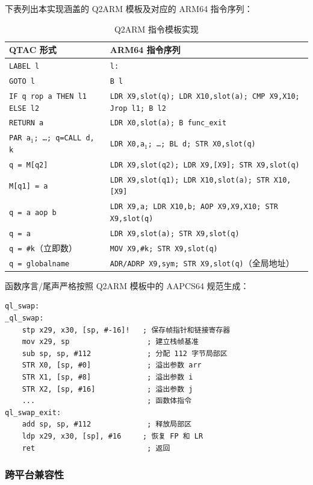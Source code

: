 \documentclass[12pt,a4paper]{ctexart}
\begin{document}
下表列出本实现涵盖的 Q2ARM 模板及对应的 ARM64 指令序列：

\begin{table}[H]
\centering
\caption{Q2ARM 指令模板实现}
\label{tab:q2arm}
\begin{tabular}{ll}
\toprule
QTAC 形式 & ARM64 指令序列 \\
\midrule
\texttt{LABEL l} & \texttt{l:} \\
\texttt{GOTO l}  & \texttt{B l} \\
\texttt{IF q rop a THEN l1 ELSE l2} & \texttt{LDR X9,slot(q); LDR X10,slot(a); CMP X9,X10; Jrop l1; B l2} \\
\texttt{RETURN a} & \texttt{LDR X0,slot(a); B func\_exit} \\
\texttt{PAR a$_1$; \ldots; q=CALL d, k} & \texttt{LDR X0,a$_1$; \ldots; BL d; STR X0,slot(q)} \\
\texttt{q = M[q2]} & \texttt{LDR X9,slot(q2); LDR X9,[X9]; STR X9,slot(q)} \\
\texttt{M[q1] = a} & \texttt{LDR X9,slot(q1); LDR X10,slot(a); STR X10,[X9]} \\
\texttt{q = a aop b} & \texttt{LDR X9,a; LDR X10,b; AOP X9,X9,X10; STR X9,slot(q)} \\
\texttt{q = a} & \texttt{LDR X9,slot(a); STR X9,slot(q)} \\
\texttt{q = \#k}（立即数） & \texttt{MOV X9,\#k; STR X9,slot(q)} \\
\texttt{q = globalname} & \texttt{ADR/ADRP X9,sym; STR X9,slot(q)}（全局地址） \\
\bottomrule
\end{tabular}
\end{table}

函数序言/尾声严格按照 Q2ARM 模板中的 AAPCS64 规范生成：

\begin{lstlisting}[language=ARM, caption={函数序言与尾声（以 swap 为例，Linux 目标）}]
ql_swap:
_ql_swap:
    stp x29, x30, [sp, #-16]!   ; 保存帧指针和链接寄存器
    mov x29, sp                  ; 建立栈帧基准
    sub sp, sp, #112             ; 分配 112 字节局部区
    STR X0, [sp, #0]             ; 溢出参数 arr
    STR X1, [sp, #8]             ; 溢出参数 i
    STR X2, [sp, #16]            ; 溢出参数 j
    ...                          ; 函数体指令
ql_swap_exit:
    add sp, sp, #112             ; 释放局部区
    ldp x29, x30, [sp], #16     ; 恢复 FP 和 LR
    ret                          ; 返回
\end{lstlisting}

\subsubsection{跨平台兼容性}
\end{document}
